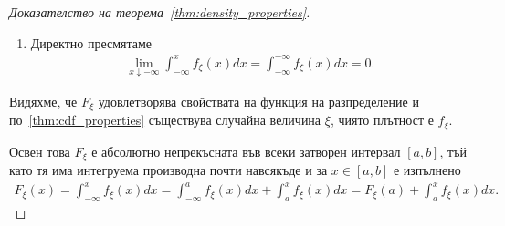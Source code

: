 \documentclass[numbers=endperiod, bibliography=totocnumbered]{scrartcl}
\begin{document}
\begin{proof}[Доказателство на теорема~\ref{thm:density_properties}]
\begin{enumerate}
    \item Директно пресмятаме
    \begin{align*}
      \lim_{x \downarrow -\infty} \int_{-\infty}^x f_\xi(x) dx
      =
      \int_{-\infty}^{-\infty} f_\xi(x) dx
      =
      0.
    \end{align*}
  \end{enumerate}

  Видяхме, че \( F_\xi \) удовлетворява свойствата на функция на разпределение и по~\ref{thm:cdf_properties} съществува случайна величина \( \xi \), чиято плътност е \( f_\xi \).

  Освен това \( F_\xi \) е абсолютно непрекъсната във всеки затворен интервал \( [a, b] \), тъй като тя има интегруема производна почти навсякъде и за \( x \in [a, b] \) е изпълнено
  \begin{align*}
    F_\xi(x)
    =
    \int_{-\infty}^x f_\xi(x) dx
    =
    \int_{-\infty}^a f_\xi(x) dx + \int_a^x f_\xi(x) dx
    =
    F_\xi(a) + \int_a^x f_\xi(x) dx.
  \end{align*}
\end{proof}
\end{document}
